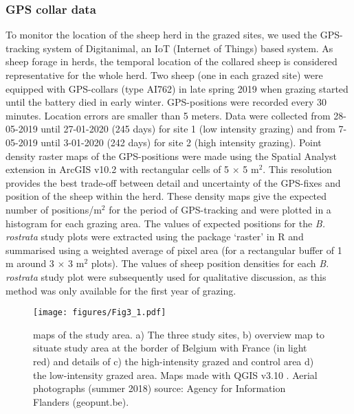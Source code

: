 \documentclass[10pt, twoside]{book} %
\begin{document}
	\subsubsection{GPS collar data}
	To monitor the location of the sheep herd in the grazed sites, we used the GPS-tracking system of Digitanimal, an IoT (Internet of Things) based system. As sheep forage in herds, the temporal location of the collared sheep is considered representative for the whole herd. Two sheep (one in each grazed site) were equipped with GPS-collars (type AI762) in late spring 2019 when grazing started until the battery died in early winter. GPS-positions were recorded every 30 minutes. Location errors are smaller than 5 meters. Data were collected from 28-05-2019 until 27-01-2020 (245 days) for site 1 (low intensity grazing) and from 7-05-2019 until 3-01-2020 (242 days) for site 2 (high intensity grazing). Point density raster maps of the GPS-positions were made using the Spatial Analyst extension in ArcGIS v10.2 \citep{esri2011} with rectangular cells of 5 $\times$ 5 m$^2$. This resolution provides the best trade-off between detail and uncertainty of the GPS-fixes and position of the sheep within the herd. These density maps give the expected number of positions/m$^2$ for the period of GPS-tracking and were plotted in a histogram for each grazing area. The values of expected positions for the \textit{B. rostrata} study plots were extracted using the package `raster' in R \citep{hijmans2017, rcoreteam2020} and summarised using a weighted average of pixel area (for a rectangular buffer of 1 m around 3 $\times$ 3 m$^2$ plots). The values of sheep position densities for each \textit{B. rostrata} study plot were subsequently used for qualitative discussion, as this method was only available for the first year of grazing.\\
		
	\begin{figure}[h!]
		\begin{center}
			\texttt{[image: figures/Fig3\_1.pdf]}
		\end{center}
		\begin{footnotesize}
			\caption{maps of the study area. a) The three study sites, b) overview map to situate study area at the border of Belgium with France (in light red) and details of c) the high-intensity grazed and control area d) the low-intensity grazed area. Maps made with QGIS v3.10 \citep{qgisdevelopmentteam2020}. Aerial photographs (summer 2018) source: Agency for Information Flanders (geopunt.be). \label{fig3.1}}
		\end{footnotesize}
	\end{figure}
	
\end{document}
